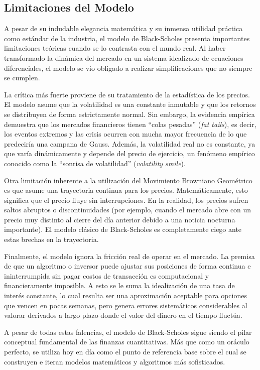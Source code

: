 \subsection{Limitaciones del Modelo}

A pesar de su indudable elegancia matemática y su inmensa utilidad práctica como estándar de la industria, el modelo de Black-Scholes presenta importantes limitaciones teóricas cuando se lo contrasta con el mundo real. Al haber transformado la dinámica del mercado en un sistema idealizado de ecuaciones diferenciales, el modelo se vio obligado a realizar simplificaciones que no siempre se cumplen.

La crítica más fuerte proviene de su tratamiento de la estadística de los precios. El modelo asume que la volatilidad es una constante inmutable y que los retornos se distribuyen de forma estrictamente normal. Sin embargo, la evidencia empírica demuestra que los mercados financieros tienen ``colas pesadas'' (\textit{fat tails}), es decir, los eventos extremos y las crisis ocurren con mucha mayor frecuencia de lo que predeciría una campana de Gauss. Además, la volatilidad real no es constante, ya que varía dinámicamente y depende del precio de ejercicio, un fenómeno empírico conocido como la ``sonrisa de volatilidad'' (\textit{volatility smile}).

Otra limitación inherente a la utilización del Movimiento Browniano Geométrico es que asume una trayectoria continua para los precios. Matemáticamente, esto significa que el precio fluye sin interrupciones. En la realidad, los precios sufren saltos abruptos o discontinuidades (por ejemplo, cuando el mercado abre con un precio muy distinto al cierre del día anterior debido a una noticia nocturna importante). El modelo clásico de Black-Scholes es completamente ciego ante estas brechas en la trayectoria.

Finalmente, el modelo ignora la fricción real de operar en el mercado. La premisa de que un algoritmo o inversor puede ajustar sus posiciones de forma continua e ininterrumpida sin pagar costos de transacción es computacional y financieramente imposible. A esto se le suma la idealización de una tasa de interés constante, lo cual resulta ser una aproximación aceptable para opciones que vencen en pocas semanas, pero genera errores sistemáticos considerables al valorar derivados a largo plazo donde el valor del dinero en el tiempo fluctúa.

A pesar de todas estas falencias, el modelo de Black-Scholes sigue siendo el pilar conceptual fundamental de las finanzas cuantitativas. Más que como un oráculo perfecto, se utiliza hoy en día como el punto de referencia base sobre el cual se construyen e iteran modelos matemáticos y algoritmos más sofisticados.

